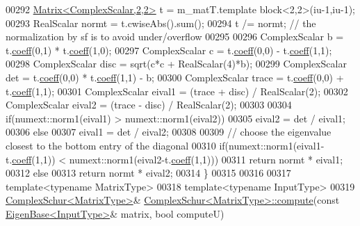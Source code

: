 \begin{DoxyCode}
00292   \hyperlink{group___core___module_class_eigen_1_1_matrix}{Matrix<ComplexScalar,2,2>} t = m\_matT.template block<2,2>(iu-1,iu-1);
00293   RealScalar normt = t.cwiseAbs().sum();
00294   t /= normt;     \textcolor{comment}{// the normalization by sf is to avoid under/overflow}
00295 
00296   ComplexScalar b = t.\hyperlink{class_eigen_1_1_plain_object_base_afbfc12954f16d21aedb7bd839f64a278}{coeff}(0,1) * t.\hyperlink{class_eigen_1_1_plain_object_base_afbfc12954f16d21aedb7bd839f64a278}{coeff}(1,0);
00297   ComplexScalar c = t.\hyperlink{class_eigen_1_1_plain_object_base_afbfc12954f16d21aedb7bd839f64a278}{coeff}(0,0) - t.\hyperlink{class_eigen_1_1_plain_object_base_afbfc12954f16d21aedb7bd839f64a278}{coeff}(1,1);
00298   ComplexScalar disc = sqrt(c*c + RealScalar(4)*b);
00299   ComplexScalar det = t.\hyperlink{class_eigen_1_1_plain_object_base_afbfc12954f16d21aedb7bd839f64a278}{coeff}(0,0) * t.\hyperlink{class_eigen_1_1_plain_object_base_afbfc12954f16d21aedb7bd839f64a278}{coeff}(1,1) - b;
00300   ComplexScalar trace = t.\hyperlink{class_eigen_1_1_plain_object_base_afbfc12954f16d21aedb7bd839f64a278}{coeff}(0,0) + t.\hyperlink{class_eigen_1_1_plain_object_base_afbfc12954f16d21aedb7bd839f64a278}{coeff}(1,1);
00301   ComplexScalar eival1 = (trace + disc) / RealScalar(2);
00302   ComplexScalar eival2 = (trace - disc) / RealScalar(2);
00303 
00304   \textcolor{keywordflow}{if}(numext::norm1(eival1) > numext::norm1(eival2))
00305     eival2 = det / eival1;
00306   \textcolor{keywordflow}{else}
00307     eival1 = det / eival2;
00308 
00309   \textcolor{comment}{// choose the eigenvalue closest to the bottom entry of the diagonal}
00310   \textcolor{keywordflow}{if}(numext::norm1(eival1-t.\hyperlink{class_eigen_1_1_plain_object_base_afbfc12954f16d21aedb7bd839f64a278}{coeff}(1,1)) < numext::norm1(eival2-t.\hyperlink{class_eigen_1_1_plain_object_base_afbfc12954f16d21aedb7bd839f64a278}{coeff}(1,1)))
00311     \textcolor{keywordflow}{return} normt * eival1;
00312   \textcolor{keywordflow}{else}
00313     \textcolor{keywordflow}{return} normt * eival2;
00314 \}
00315 
00316 
00317 \textcolor{keyword}{template}<\textcolor{keyword}{typename} MatrixType>
00318 \textcolor{keyword}{template}<\textcolor{keyword}{typename} InputType>
00319 \hyperlink{group___eigenvalues___module}{ComplexSchur<MatrixType>}& 
      \hyperlink{group___eigenvalues___module_a3543d2c286563108cd9ace672bbb1c09}{ComplexSchur<MatrixType>::compute}(\textcolor{keyword}{const} 
      \hyperlink{group___core___module_struct_eigen_1_1_eigen_base}{EigenBase<InputType>}& matrix, \textcolor{keywordtype}{bool} computeU)

\end{DoxyCode}
